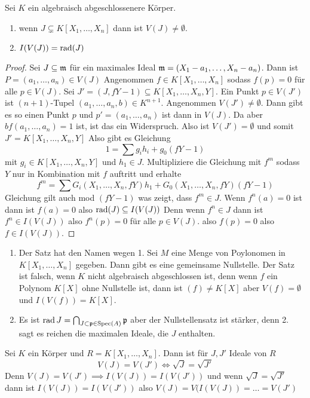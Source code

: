 \begin{Satz}[Nullstellensatz]
    Sei $K$ ein algebraisch abgeschlossenere Körper.
    \begin{enumerate}
        \item wenn $J\subsetneq K[X_1,\dots,X_n]$ dann ist $V(J)\neq\emptyset$.
        \item $I(V(J))=\operatorname{rad}(J)$
    \end{enumerate}
\end{Satz}
\begin{proof}
    Sei $J\subseteq\mathfrak{m}$ für ein maximales Ideal $\mathfrak{m}=(X_1-a_1,\dots,X_n-a_n)$.
    Dann ist $P=(a_1,\dots,a_n)\in V(J)$
    Angenommen $f\in K[X_1,\dots,X_n]$ sodass $f(p)=0$ für alle $p\in V(J)$. Sei $J'=(J,fY-1)\subseteq K[X_1,\dots,X_n,Y]$. Ein Punkt $p\in V(J')$ ist $(n+1)$-Tupel $(a_1,\dots,a_n,b)\in K^{n+1}$. Angenommen $V(J')\neq \emptyset$.
    Dann gibt es so einen Punkt $p$ und $p'=(a_1,\dots,a_n)$ ist dann in $V(J)$. Da aber $bf(a_1,\dots,a_n)=1$ ist, ist das ein Widerspruch. Also ist $V(J')=\emptyset$ und somit $J'=K[X_1,\dots,X_n,Y]$
    Also gibt es Gleichung 
    $$1=\sum g_ih_i+g_0(fY-1)$$ mit $g_i\in K[X_1,\dots,X_n,Y]$ und $h_1\in J$.
    Multipliziere die Gleichung mit $f^m$ sodass $Y$ nur in Kombination mit $f$ auftritt und erhalte
    $$f^m=\sum G_i(X_1,\dots,X_n,fY)h_1+G_0(X_1,\dots,X_n,fY)(fY-1)$$ Gleichung gilt auch mod $(fY-1)$ was zeigt, dass $f^m\in J$.
    Wenn $f^n(a)=0$ ist dann ist $f(a)=0$ also $\operatorname{rad}(J)\subseteq I(V(J))$ Denn wenn $f^n\in J$ dann ist $f^n\in I(V(J))$ also $f^n(p)=0$ für alle $p\in V(J)$. also $f(p)=0$ also $f\in I(V(J))$.
\end{proof}

\begin{Bem}
    \begin{enumerate}
        \item Der Satz hat den Namen wegen 1. Sei $M$ eine Menge von Poylonomen in $K[X_1,\dots,X_n]$ gegeben. Dann gibt es eine gemeinsame Nullstelle. Der Satz ist falsch, wenn $K$ nicht algebraisch abgeschlossen ist, denn wenn $f$ ein Polynom $K[X]$ ohne Nullstelle ist, dann ist $(f)\neq K[X]$ aber $V(f)=\emptyset$ und $I(V(f))=K[X]$.
        \item Es ist $\operatorname{rad} J=\bigcap_{J\subset \mathfrak{p}\in \operatorname{Spec}(A)}\mathfrak{p}$ aber der Nullstellensatz ist stärker, denn 2. sagt es reichen die maximalen Ideale, die $J$ enthalten.
    \end{enumerate}
    
\end{Bem}
\begin{Bem}
    Sei $K$ ein Körper und $R=K[X_1,\dots,X_n]$. Dann ist für   $J,J'$ Ideale von $R$
    $$V(J)=V(J')\iff \sqrt{J}=\sqrt{J'}$$
    Denn $V(J)=V(J')\implies I(V(J))=I(V(J'))$ und wenn $\sqrt{J}=\sqrt{J'}$ dann ist $I(V(J))=I(V(J'))$ also $V(J)=V(I(V(J))=\dots=V(J')$
\end{Bem}
